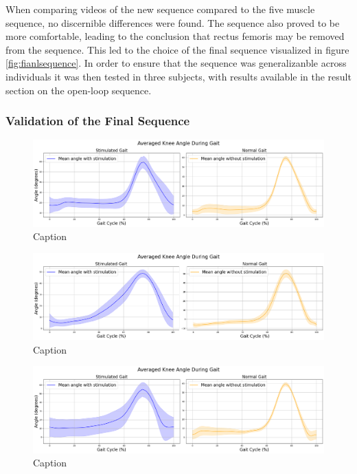 When comparing videos of the new sequence compared to the five muscle sequence, no discernible differences were found. The sequence also proved to be more comfortable, leading to the conclusion that rectus femoris may be removed from the sequence. This led to the choice of the final sequence visualized in figure \ref{fig:fianlsequence}. In order to ensure that the sequence was generalizanble across individuals it was then tested in three subjects, with results available in the result section on the open-loop sequence.

\subsubsection{Validation of the Final Sequence}
\begin{figure}[h]
    \centering
    \includegraphics[width=0.99\linewidth]{images/alexisoutput1.png}
    \caption{Caption}
    \label{fig:alexisout}
\end{figure}

\begin{figure}[h]
    \centering
    \includegraphics[width=0.99\linewidth]{images/katlaoutput1.png}
    \caption{Caption}
    \label{fig:katlaout}
\end{figure}

\begin{figure} [h]
    \centering
    \includegraphics[width=0.99\linewidth]{images/leonioutput1.png}
    \caption{Caption}
    \label{fig:leoniout}
\end{figure}

